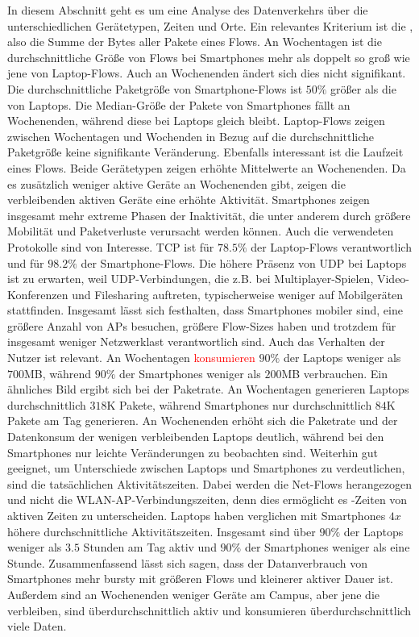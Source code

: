 \documentclass[12pt, a4paper]{article}
\begin{document}
In diesem Abschnitt geht es um eine Analyse des Datenverkehrs über die unterschiedlichen Gerätetypen,
Zeiten und Orte. Ein relevantes Kriterium ist die , also die Summe der Bytes aller Pakete eines Flows.
An Wochentagen ist die durchschnittliche Größe von Flows bei Smartphones mehr als doppelt so groß wie jene von Laptop-Flows.
Auch an Wochenenden ändert sich dies nicht signifikant. Die durchschnittliche Paketgröße von Smartphone-Flows ist $50 \%$ größer
als die von Laptops. Die Median-Größe der Pakete von Smartphones fällt an Wochenenden, während diese bei Laptops gleich bleibt.
Laptop-Flows zeigen zwischen Wochentagen und Wochenden in Bezug auf die durchschnittliche Paketgröße keine signifikante Veränderung.
Ebenfalls interessant ist die Laufzeit eines Flows. Beide Gerätetypen zeigen erhöhte Mittelwerte an Wochenenden.
Da es zusätzlich weniger aktive Geräte an Wochenenden gibt, zeigen die verbleibenden aktiven Geräte eine erhöhte Aktivität.
Smartphones zeigen insgesamt mehr extreme Phasen der Inaktivität, die unter anderem durch größere Mobilität und Paketverluste
verursacht werden können.\newline
Auch die verwendeten Protokolle sind von Interesse. TCP ist für $78.5 \%$ der Laptop-Flows verantwortlich
und für $98.2 \%$ der Smartphone-Flows. Die höhere Präsenz von UDP bei Laptops ist zu erwarten, weil
UDP-Verbindungen, die z.B. bei Multiplayer-Spielen, Video-Konferenzen und Filesharing auftreten,
typischerweise weniger auf Mobilgeräten stattfinden.
Insgesamt lässt sich festhalten, dass Smartphones mobiler sind, eine größere Anzahl von APs besuchen,
größere Flow-Sizes haben und trotzdem für insgesamt weniger Netzwerklast verantwortlich sind.\newline
Auch das Verhalten der Nutzer ist relevant. An Wochentagen \textcolor{red}{konsumieren} $90 \%$ der Laptops weniger als $700$\textsc{MB},
während $90 \%$ der Smartphones weniger als $200$\textsc{MB} verbrauchen.
Ein ähnliches Bild ergibt sich bei der Paketrate. An Wochentagen generieren Laptops durchschnittlich $318$\textsc{K} Pakete, 
während Smartphones nur durchschnittlich $84$\textsc{K} Pakete am Tag generieren. 
An Wochenenden erhöht sich die Paketrate und der Datenkonsum der wenigen verbleibenden Laptops deutlich,
während bei den Smartphones nur leichte Veränderungen zu beobachten sind.\newline
Weiterhin gut geeignet, um Unterschiede zwischen Laptops und Smartphones zu verdeutlichen, sind die tatsächlichen Aktivitätszeiten.
Dabei werden die Net-Flows herangezogen und nicht die WLAN-AP-Verbindungszeiten, denn dies ermöglicht es -Zeiten
von aktiven Zeiten zu unterscheiden. Laptops haben verglichen mit Smartphones $4x$ höhere durchschnittliche Aktivitätszeiten.
Insgesamt sind über $90 \%$ der Laptops weniger als $3.5$ Stunden am Tag aktiv und $90 \%$ der Smartphones weniger als eine Stunde.\newline
Zusammenfassend lässt sich sagen, dass der Datanverbrauch von Smartphones mehr bursty mit größeren Flows und kleinerer aktiver Dauer ist.
Außerdem sind an Wochenenden weniger Geräte am Campus, aber jene die verbleiben, sind überdurchschnittlich aktiv 
und konsumieren überdurchschnittlich viele Daten.
\end{document}
